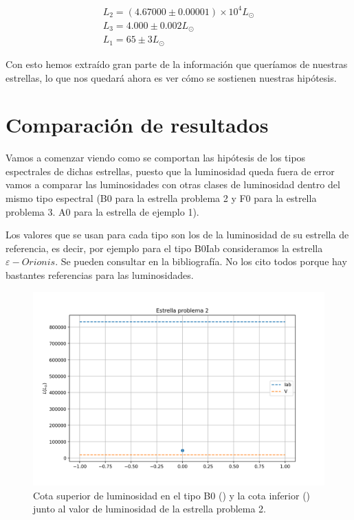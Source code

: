 \documentclass{aa} %
\begin{document}
$$
\begin{array}{c}
L_2 = (4.67000 \pm 0.00001) \times 10^4 L_{\odot} \\ L_3 = 4.000 \pm 0.002 L_{\odot} \\
L_1 = 65 \pm 3 L_{\odot}
\end{array}
$$ 

Con esto hemos extraído gran parte de la información que queríamos de nuestras estrellas, lo que nos quedará ahora es ver cómo se sostienen nuestras hipótesis.

\section{Comparación de resultados}

Vamos a comenzar viendo como se comportan las hipótesis de los tipos espectrales de dichas estrellas, puesto que la luminosidad queda fuera de error vamos a comparar las luminosidades con otras clases de luminosidad dentro del mismo tipo espectral (B0 para la estrella problema 2 y F0 para la estrella problema 3. A0 para la estrella de ejemplo 1).

Los valores que se usan para cada tipo son los de la luminosidad de su estrella de referencia, es decir, por ejemplo para el tipo B0Iab consideramos la estrella $\varepsilon - Orionis$. Se pueden consultar en la bibliografía. No los cito todos porque hay bastantes referencias para las luminosidades.

\begin{figure}[h!]
\begin{center}
\includegraphics[scale=0.35]{TipoB.png}
\caption{Cota superior de luminosidad en el tipo B0 (\cite{Puebla_2015}) y la cota inferior (\cite{CiteDrive2022}) junto al valor de luminosidad de la estrella problema 2.}
\label{fig:tipoB}
\end{center}
\end{figure}
\end{document}
